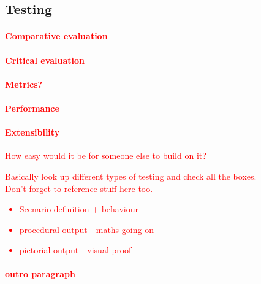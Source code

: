 \documentclass[12pt,a4,xcolor=table]{article}
\begin{document}
	\subsection{Testing}
	
	\textcolor{red}{
		\paragraph{Comparative evaluation}
		\paragraph{Critical evaluation}
		\paragraph{Metrics?}
		\paragraph{Performance}
		\paragraph{Extensibility}
		How easy would it be for someone else to build on it?
	}
	
	\textcolor{red}{
	Basically look up different types of testing and check all the boxes.\\
	Don't forget to reference stuff here too.
	\begin{itemize}
		\item Scenario definition + behaviour
		\item procedural output - maths going on
		\item pictorial output - visual proof
	\end{itemize}
	\paragraph{outro paragraph}
	}
\end{document}
